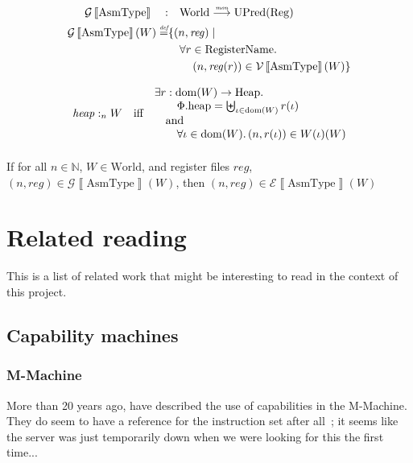 \documentclass{article}
\newcommand{\forcenewline}{$\phantom{v}$\\}
\newcommand{\sem}[1]{\left\llbracket #1 \right\rrbracket}
\newcommand{\monfun}{\stackrel{\textit{\tiny{mon}}}{\longrightarrow}}
\newcommand{\defeq}{\stackrel{\textit{\tiny{def}}}{=}}
\DeclareMathOperator{\dom}{dom}
\newcommand{\var}[1]{\mathit{#1}}
\newcommand{\reg}{\var{reg}}
\newcommand{\heap}{\var{heap}}
\newcommand{\plainproj}[1]{\mathrm{#1}}
\newcommand{\memheap}[1][\Phi]{#1.\plainproj{heap}}
\newcommand{\heapSat}[3][\heap]{#1 :_{#2} #3}
\newcommand{\asmType}{\plaindom{AsmType}}
\newcommand{\plaindom}[1]{\mathrm{#1}}
\newcommand{\RegName}{\plaindom{RegisterName}}
\newcommand{\Regs}{\plaindom{Reg}}
\newcommand{\Heaps}{\plaindom{Heap}}
\newcommand{\nats}{\mathbb{N}}
\newcommand{\Worlds}{\plaindom{World}}
\newcommand{\UPred}[1]{\plaindom{UPred}(#1)}
\newcommand{\intr}[2]{\mathcal{#1}\sem{#2}}
\newcommand{\valueintr}[1]{\intr{V}{#1}}
\newcommand{\exprintr}[1]{\intr{E}{#1}}
\newcommand{\envintr}[1]{\intr{G}{#1}}
\newcommand{\stdvr}{\valueintr{\asmType}}
\newcommand{\stder}{\exprintr{\asmType}}
\newcommand{\stdgr}{\envintr{\asmType}}
\newcommand{\npair}[2][n]{\left(#1,#2 \right)}
\begin{document}
\begin{align*}
  \stdgr \quad : & \quad \Worlds \monfun \UPred{\Regs} \\
  \stdgr(W) \defeq & \{ \npair{\reg} \mid \\
                    & \quad \forall r \in \RegName \ldotp \\
                    & \qquad  \npair{\reg(r)} \in \stdvr(W) \}
\end{align*}

\begin{definition}
\begin{align*}
  \heapSat{n}{W} & & \text{iff} & &
                                      \arraycolsep=0pt
                                      \begin{array}{l}
                                      \exists r: \dom(W) \rightarrow \Heaps \ldotp \\
                                      \qquad\memheap = \biguplus_{\iota\in \dom(W)} r(\iota)\\
                                      \quad\text{and}\\
                                      \qquad\forall \iota \in \dom(W) \ldotp \npair{r(\iota)} \in W(\iota)(W)
                                      \end{array}\\
\end{align*}


\end{definition}
\begin{lemma} \forcenewline
  If for all $n \in \nats$, $W \in \Worlds$, and register files $\reg$, $\npair{\reg} \in \stdgr(W)$, then $(n,\reg) \in \stder(W)$
\end{lemma}

\section{Related reading}
\label{sec:related-reading}

This is a list of related work that might be interesting to read in the context
of this project.

\subsection{Capability machines}
\label{sec:rw-cap-machines}

\subsubsection{M-Machine}
More than 20 years ago, \cite{Carter:1994:HSF:195473.195579} have described the
use of capabilities in the M-Machine. They do seem to have a reference for the
instruction set after all~\citep{Dally1997Memo59}; it seems like the server was
just temporarily down when we were looking for this the first time...
\end{document}
